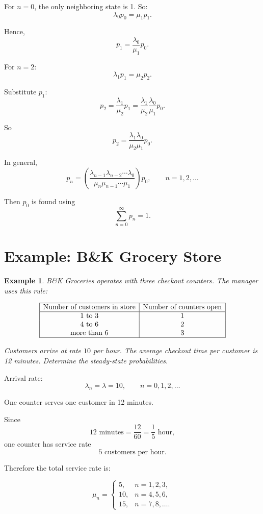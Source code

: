 \documentclass[12pt]{article}
\newtheorem{example}{Example}
\begin{document}
For \(n=0\), the only neighboring state is 1. So:
\[
\lambda_0p_0=\mu_1p_1.
\]

Hence,
\[
p_1=\frac{\lambda_0}{\mu_1}p_0.
\]

For \(n=2\):
\[
\lambda_1p_1=\mu_2p_2.
\]

Substitute \(p_1\):
\[
p_2
=
\frac{\lambda_1}{\mu_2}p_1
=
\frac{\lambda_1}{\mu_2}\frac{\lambda_0}{\mu_1}p_0.
\]

So
\[
p_2=\frac{\lambda_1\lambda_0}{\mu_2\mu_1}p_0.
\]

In general,
\[
\boxed{
p_n
=
\left(
\frac{\lambda_{n-1}\lambda_{n-2}\cdots\lambda_0}
{\mu_n\mu_{n-1}\cdots\mu_1}
\right)p_0,\qquad n=1,2,\ldots
}
\]

Then \(p_0\) is found using
\[
\boxed{
\sum_{n=0}^{\infty}p_n=1.
}
\]

\section{Example: B\&K Grocery Store}

\begin{example}
B\&K Groceries operates with three checkout counters. The manager uses this rule:

\[
\begin{array}{|c|c|}
\hline
\text{Number of customers in store} & \text{Number of counters open}\\
\hline
1\text{ to }3 & 1\\
4\text{ to }6 & 2\\
\text{more than }6 & 3\\
\hline
\end{array}
\]

Customers arrive at rate \(10\) per hour. The average checkout time per customer is 12 minutes. Determine the steady-state probabilities.
\end{example}

Arrival rate:
\[
\lambda_n=\lambda=10,\qquad n=0,1,2,\ldots
\]

One counter serves one customer in 12 minutes.

Since
\[
12\text{ minutes}=\frac{12}{60}=\frac15\text{ hour},
\]
one counter has service rate
\[
5\text{ customers per hour}.
\]

Therefore the total service rate is:

\[
\mu_n=
\begin{cases}
5, & n=1,2,3,\\
10, & n=4,5,6,\\
15, & n=7,8,\ldots.
\end{cases}
\]
\end{document}
